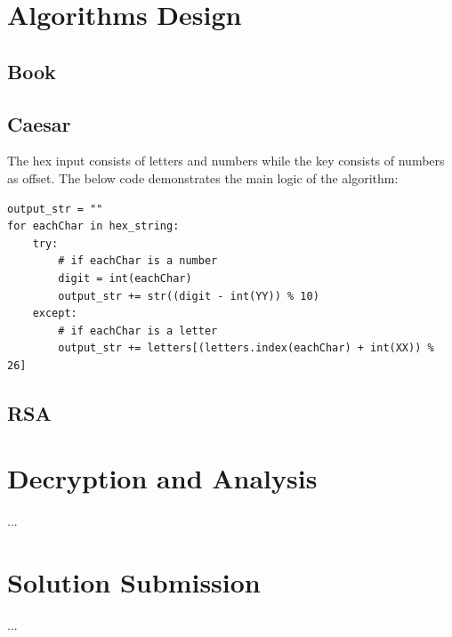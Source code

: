 \documentclass[12pt]{article}
\begin{document}
\section{Algorithms Design}
\subsection{Book}
\subsection{Caesar}
The hex input consists of letters and numbers while the key consists of numbers as offset. The below code demonstrates the main logic of the algorithm:
\begin{lstlisting}
output_str = ""
for eachChar in hex_string:
    try:
    	# if eachChar is a number
        digit = int(eachChar)
        output_str += str((digit - int(YY)) % 10)
    except:
    	# if eachChar is a letter
        output_str += letters[(letters.index(eachChar) + int(XX)) % 26]
\end{lstlisting}
\subsection{RSA}

\section{Decryption and Analysis}
...

\section{Solution Submission}
...



\end{document}
